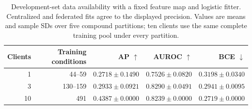 \begin{table}[ht]
\centering\small
\caption{Development-set data availability with a fixed feature map and logistic fitter. Centralized and federated fits agree to the displayed precision. Values are means and sample SDs over five compound partitions; ten clients use the same complete training pool under every partition.}
\label{tab:federated-development}
\begin{tabular}{rrrrr}
\toprule
Clients & Training conditions & AP $\uparrow$ & AUROC $\uparrow$ & BCE $\downarrow$ \\
\midrule
1 & 44--59 & $0.2718 \pm 0.1490$ & $0.7526 \pm 0.0820$ & $0.3198 \pm 0.0340$ \\
3 & 130--159 & $0.2933 \pm 0.0921$ & $0.8290 \pm 0.0491$ & $0.2941 \pm 0.0095$ \\
10 & 491 & $0.4387 \pm 0.0000$ & $0.8239 \pm 0.0000$ & $0.2719 \pm 0.0000$ \\
\bottomrule
\end{tabular}
\end{table}

